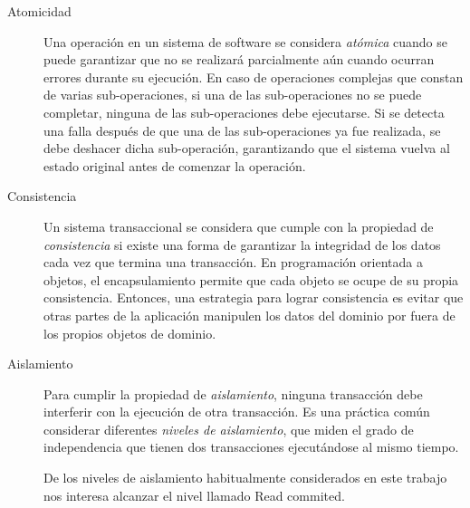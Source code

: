 \begin{description}
	\item[Atomicidad]
		Una operación en un sistema de software se considera \emph{atómica} cuando se
		puede garantizar que no se realizará parcialmente aún cuando ocurran errores
		durante su ejecución. 
		En caso de operaciones complejas que constan de varias sub-operaciones, si una
		de las sub-operaciones no se puede completar, ninguna de las sub-operaciones
		debe ejecutarse. Si se detecta una falla después de que una de las
		sub-operaciones ya fue realizada, se debe deshacer dicha
		sub-operación, garantizando que el sistema vuelva al estado original antes de
		comenzar la operación.
		
	\item[Consistencia]
		Un sistema transaccional se considera que cumple con la propiedad de
		\emph{consistencia} si existe una forma de garantizar la integridad de los
		datos cada vez que termina una transacción.
		En programación orientada a objetos, el encapsulamiento permite que cada
		objeto se ocupe de su propia consistencia. 
		Entonces, una estrategia para lograr consistencia es evitar que otras partes
		de la aplicación manipulen los datos del dominio por fuera de los
		propios objetos de dominio.
	  
	\item[Aislamiento] \label{isolation}
		Para cumplir la propiedad de \emph{aislamiento}, ninguna
		transacción debe interferir con la ejecución de otra transacción.
		Es una práctica común considerar diferentes \emph{niveles de aislamiento},
		que miden el grado de independencia que tienen dos transacciones ejecutándose
		al mismo tiempo.

		De los niveles de aislamiento habitualmente considerados \cite{ANSI:1992:ANSd} en este
		trabajo nos interesa alcanzar el nivel llamado Read commited. 


% 		
% 				
	
	\end{description}
		
